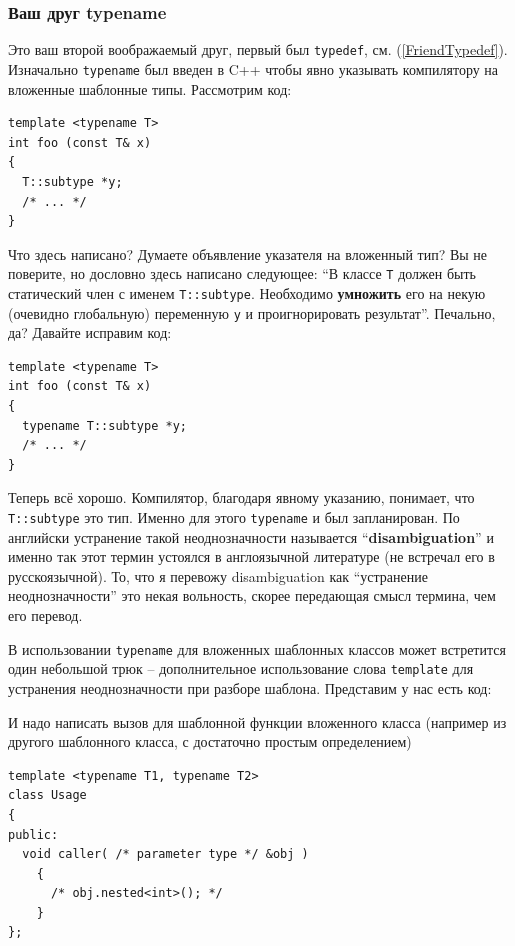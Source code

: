 \documentclass[a4paper,12pt,oneside]{article}
\begin{document}
\subsubsection{Ваш друг typename}\label{FriendTypename}

Это ваш второй воображаемый друг, первый был \lstinline!typedef!, см. (\ref{FriendTypedef}). Изначально \lstinline!typename! был введен в C++ чтобы явно указывать компилятору на вложенные шаблонные типы. Рассмотрим код:

\begin{lstlisting}
template <typename T>
int foo (const T& x)
{
  T::subtype *y;
  /* ... */
}
\end{lstlisting}

Что здесь написано? Думаете объявление указателя на вложенный тип? Вы не поверите, но дословно здесь написано 
следующее: ``В классе \lstinline!T! должен быть статический член с именем \lstinline!T::subtype!. Необходимо \textbf{умножить} его на некую (очевидно глобальную) переменную \lstinline!y! и проигнорировать результат''. Печально, да? Давайте исправим код:

\begin{lstlisting}
template <typename T>
int foo (const T& x)
{
  typename T::subtype *y;
  /* ... */
}
\end{lstlisting}

Теперь всё хорошо. Компилятор, благодаря явному указанию, понимает, что \lstinline!T::subtype! это тип. Именно для этого \lstinline!typename! и был запланирован. По английски устранение такой неоднозначности называется ``\textbf{disambiguation}''  и именно так этот термин устоялся в англоязычной литературе (не встречал его в русскоязычной). То, что я перевожу disambiguation как ``устранение неоднозначности'' это некая вольность, скорее передающая смысл термина, чем его перевод.

В использовании \lstinline!typename! для вложенных шаблонных классов может встретится один небольшой трюк -- дополнительное использование слова \lstinline!template! для устранения неоднозначности при разборе шаблона. Представим у нас есть код:



И надо написать вызов для шаблонной функции вложенного класса (например из другого шаблонного класса, с достаточно простым определением)

\begin{lstlisting}
template <typename T1, typename T2>
class Usage
{
public:
  void caller( /* parameter type */ &obj )
    {
      /* obj.nested<int>(); */
    }
};
\end{lstlisting}
\end{document}
